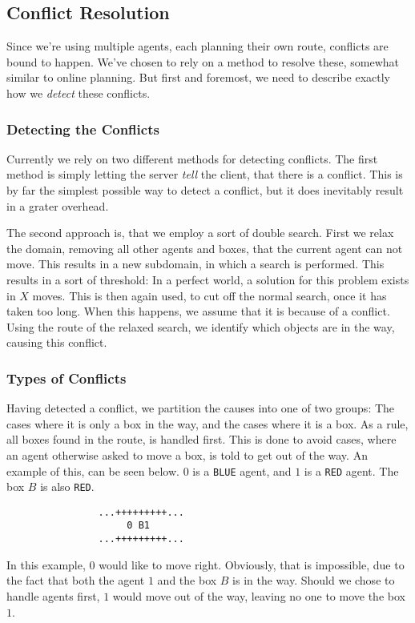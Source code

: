 \documentclass[10pt,a4paper]{article}
\begin{document}
	\subsection{Conflict Resolution}
		Since we're using multiple agents, each planning their own route, conflicts are bound to happen. We've chosen to rely on a method to resolve these, somewhat similar to online planning. But first and foremost, we need to describe exactly how we \emph{detect} these conflicts.

		\subsubsection{Detecting the Conflicts}
			Currently we rely on two different methods for detecting conflicts. The first method is simply letting the server \emph{tell} the client, that there is a conflict. This is by far the simplest possible way to detect a conflict, but it does inevitably result in a grater overhead. 

			The second approach is, that we employ a sort of double search. First we relax the domain, removing all other agents and boxes, that the current agent can not move. This results in a new subdomain, in which a search is performed. This results in a sort of threshold: In a perfect world, a solution for this problem exists in $X$ moves. This is then again used, to cut off the normal search, once it has taken too long. When this happens, we assume that it is because of a conflict. Using the route of the relaxed search, we identify which objects are in the way, causing this conflict.

		\subsubsection{Types of Conflicts}

			Having detected a conflict, we partition the causes into one of two groups: The cases where it is only a box in the way, and the cases where it is a box. As a rule, all boxes found in the route, is handled first. This is done to avoid cases, where an agent otherwise asked to move a box, is told to get out of the way. An example of this, can be seen below. $0$ is a \verb=BLUE= agent, and $1$ is a \verb=RED= agent. The box $B$ is also \verb=RED=. 
			\begin{verbatim}
				...+++++++++...
				     0 B1
				...+++++++++...
			\end{verbatim}
			In this example, $0$ would like to move right. Obviously, that is impossible, due to the fact that both the agent $1$ and the box $B$ is in the way. Should we chose to handle agents first, $1$ would move out of the way, leaving no one to move the box $1$.
\end{document}
